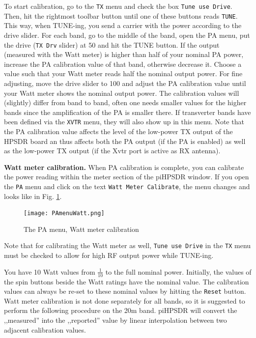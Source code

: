 \documentclass[12pt]{book}
\def\rett#1{\texttt{\color{red}#1}}
\def\bltt#1{\texttt{\color{blue}#1}}
\def\pH{pi\-HPSDR\xspace}
\begin{document}
To start calibration, go to the \bltt{TX} menu and check the
box \rett{Tune use Drive}. Then, hit the rightmost toolbar button
until one of these buttons reads \bltt{TUNE}. This way, when
TUNE-ing, you send a carrier with the power according to the drive
slider. For each band, go to the middle of the band, open the PA
menu, put the drive (\rett{TX Drv} slider) at 50 and hit the TUNE button. If the
output (measured with the Watt meter) is higher than half
of your nominal PA power, increase the
PA calibration value of that band, otherwise decrease it. Choose
a value such that your Watt meter reads half the nominal output
power. For fine adjusting, move the drive slider to 100 and
adjust the PA calibration value until your Watt meter shows the
nominal output  power. The calibration values will  (slightly)
differ from band to band, often one needs smaller values for the
higher bands since the amplification of the PA is smaller there.
If transverter bands have been defined via the \bltt{XVTR} menu,
they will also show up in this menu. Note that the PA calibration
value affects the level of the low-power TX output of the HPSDR board
an thus affects both the PA output (if the PA is enabled) as well
as the low-power TX output (if the Xvtr port is active as RX antenna).

\textbf{Watt meter calibration.} When PA calibration is complete,
you can calibrate the power reading within the meter section of
the \pH window. If you open the \bltt{PA} menu and click
on the text \rett{Watt Meter Calibrate}, the menu changes
and looks like in Fig. \ref{fig:PAMenuWatt}.

\begin{figure}[ht]
\center
\texttt{[image: PAmenuWatt.png]}
\caption{The PA menu, Watt meter calibration}
\label{fig:PAMenuWatt}
\end{figure}
Note that for calibrating the Watt meter as well,
\rett{Tune use Drive} in the \bltt{TX} menu must be checked
to allow for high RF output
power while TUNE-ing.

You have 10 Watt values from $\frac{1}{10}$ to the full nominal power. Initially,
the values of the spin buttons beside the Watt ratings have the nominal value.
The calibration values can always be re-set to these nominal values by hitting
the \rett{Reset} button. Watt meter calibration is not done separately for all
bands, so it is suggested to perform the following procedure on the 20m band.
\pH will convert the ,,measured'' into the ,,reported'' value by linear
interpolation between two adjacent calibration values.
\end{document}
